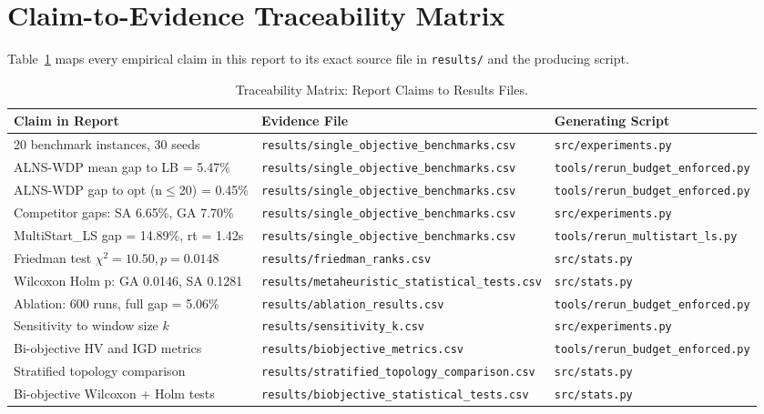 \documentclass[journal]{IEEEtran}
\begin{document}
\appendix
\section{Claim-to-Evidence Traceability Matrix}
Table~\ref{tab:traceability} maps every empirical claim in this report to its exact source file in \texttt{results/} and the producing script.

\begin{table}[htbp]
\centering
\small
\caption{Traceability Matrix: Report Claims to Results Files.}
\label{tab:traceability}
\begin{tabularx}{\textwidth}{p{5.5cm}p{6.0cm}p{4.5cm}}
\toprule
\textbf{Claim in Report} & \textbf{Evidence File} & \textbf{Generating Script} \\
\midrule
20 benchmark instances, 30 seeds & \texttt{results/single\_objective\_benchmarks.csv} & \texttt{src/experiments.py} \\
ALNS-WDP mean gap to LB = 5.47\% & \texttt{results/single\_objective\_benchmarks.csv} & \texttt{tools/rerun\_budget\_enforced.py} \\
ALNS-WDP gap to opt (n$\le$20) = 0.45\% & \texttt{results/single\_objective\_benchmarks.csv} & \texttt{tools/rerun\_budget\_enforced.py} \\
Competitor gaps: SA 6.65\%, GA 7.70\% & \texttt{results/single\_objective\_benchmarks.csv} & \texttt{src/experiments.py} \\
MultiStart\_LS gap = 14.89\%, rt = 1.42s & \texttt{results/single\_objective\_benchmarks.csv} & \texttt{tools/rerun\_multistart\_ls.py} \\
Friedman test $\chi^2=10.50, p=0.0148$ & \texttt{results/friedman\_ranks.csv} & \texttt{src/stats.py} \\
Wilcoxon Holm p: GA 0.0146, SA 0.1281 & \texttt{results/metaheuristic\_statistical\_tests.csv} & \texttt{src/stats.py} \\
Ablation: 600 runs, full gap = 5.06\% & \texttt{results/ablation\_results.csv} & \texttt{tools/rerun\_budget\_enforced.py} \\
Sensitivity to window size $k$ & \texttt{results/sensitivity\_k.csv} & \texttt{src/experiments.py} \\
Bi-objective HV and IGD metrics & \texttt{results/biobjective\_metrics.csv} & \texttt{tools/rerun\_budget\_enforced.py} \\
Stratified topology comparison & \texttt{results/stratified\_topology\_comparison.csv} & \texttt{src/stats.py} \\
Bi-objective Wilcoxon + Holm tests & \texttt{results/biobjective\_statistical\_tests.csv} & \texttt{src/stats.py} \\

\end{tabularx}
\end{table}
\end{document}
